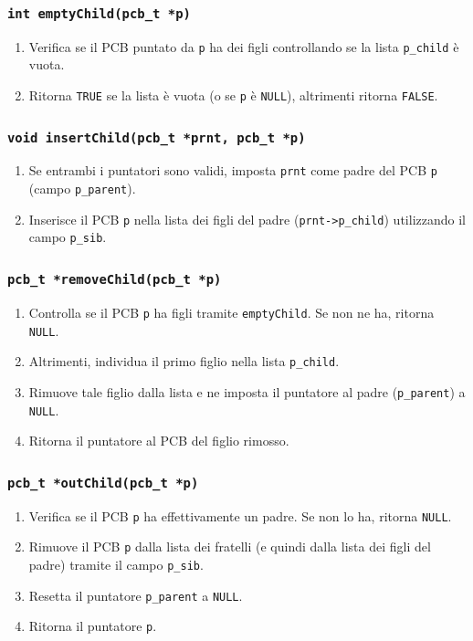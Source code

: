 \documentclass[a4paper,12pt]{article}
\begin{document}
\subsubsection{\texttt{int emptyChild(pcb\_t *p)}}
\begin{enumerate}
    \item Verifica se il PCB puntato da \texttt{p} ha dei figli controllando se la lista \texttt{p\_child} è vuota.
    \item Ritorna \texttt{TRUE} se la lista è vuota (o se \texttt{p} è \texttt{NULL}), altrimenti ritorna \texttt{FALSE}.
\end{enumerate}

\subsubsection{\texttt{void insertChild(pcb\_t *prnt, pcb\_t *p)}}
\begin{enumerate}
    \item Se entrambi i puntatori sono validi, imposta \texttt{prnt} come padre del PCB \texttt{p} (campo \texttt{p\_parent}).
    \item Inserisce il PCB \texttt{p} nella lista dei figli del padre (\texttt{prnt->p\_child}) utilizzando il campo \texttt{p\_sib}.
\end{enumerate}

\subsubsection{\texttt{pcb\_t *removeChild(pcb\_t *p)}}
\begin{enumerate}
    \item Controlla se il PCB \texttt{p} ha figli tramite \texttt{emptyChild}. Se non ne ha, ritorna \texttt{NULL}.
    \item Altrimenti, individua il primo figlio nella lista \texttt{p\_child}.
    \item Rimuove tale figlio dalla lista e ne imposta il puntatore al padre (\texttt{p\_parent}) a \texttt{NULL}.
    \item Ritorna il puntatore al PCB del figlio rimosso.
\end{enumerate}

\subsubsection{\texttt{pcb\_t *outChild(pcb\_t *p)}}
\begin{enumerate}
    \item Verifica se il PCB \texttt{p} ha effettivamente un padre. Se non lo ha, ritorna \texttt{NULL}.
    \item Rimuove il PCB \texttt{p} dalla lista dei fratelli (e quindi dalla lista dei figli del padre) tramite il campo \texttt{p\_sib}.
    \item Resetta il puntatore \texttt{p\_parent} a \texttt{NULL}.
    \item Ritorna il puntatore \texttt{p}.
\end{enumerate}
\end{document}
